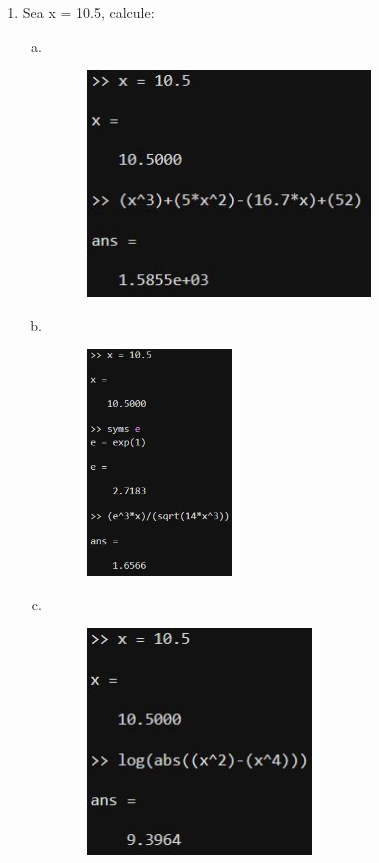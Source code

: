 \documentclass{article}
\begin{document}
\begin{enumerate}
    \newpage
    
    \item 

    Sea x = 10.5, calcule:

    \begin{enumerate}[a)]

        \item 
        \
        \begin{figure}[H]
        \centering
        \includegraphics[height=6cm]{img5a.jpg}
        \end{figure}

        \item 
        \
        \begin{figure}[H]
        \centering
        \includegraphics[height=6cm]{img5b.jpg}
        \end{figure}

        \item 
        \
        \begin{figure}[H]
        \centering
        \includegraphics[height=6cm]{img5c.jpg}
        \end{figure}


\end{enumerate}
\end{enumerate}
\end{document}
